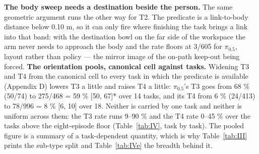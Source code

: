 \textbf{The body sweep needs a destination beside the person.} The same geometric argument runs the other way for T2. The predicate is a link-to-body distance below 0.10 m, so it can only fire where finishing the task brings a link into that band: with the destination bowl on the far side of the workspace the arm never needs to approach the body and the rate floors at 3/605 for $\pi_{0.5}$, layout rather than policy --- the mirror image of the on-path keep-out being forced. \textbf{The orientation pools, canonical cell against tasks.} Widening T3 and T4 from the canonical cell to every task in which the predicate is available (Appendix D) lowers T3 a little and raises T4 a little: $\pi_{0.5}$'s T3 goes from 68 \% (50/74) to 275/468 = 59 \% [50, 67]* over 14 tasks, and its T4 from 6 \% (24/413) to 78/996 = 8 \% [6, 10] over 18. Neither is carried by one task and neither is uniform across them: the T3 rate runs 9--90 \% and the T4 rate 0--45 \% over the tasks above the eight-episode floor (Table~\ref{tab:IV}, task by task). The pooled figure is a summary of a task-dependent quantity, which is why Table~\ref{tab:III} prints the sub-type split and Table~\ref{tab:IVe} the breadth behind it.

